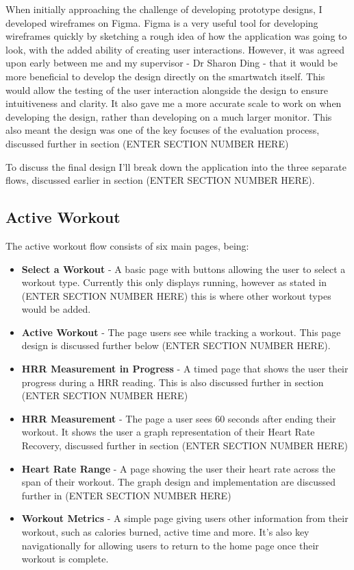 \documentclass{l4proj}
\begin{document}
When initially approaching the challenge of developing prototype designs, I developed wireframes on Figma. Figma is a very useful tool for developing wireframes quickly by sketching a rough idea of how the application was going to look, with the added ability of creating user interactions. However, it was agreed upon early between me and my supervisor - Dr Sharon Ding - that it would be more beneficial to develop the design directly on the smartwatch itself. This would allow the testing of the user interaction alongside the design to ensure intuitiveness and clarity. It also gave me a more accurate scale to work on when developing the design, rather than developing on a much larger monitor. This also meant the design was one of the key focuses of the evaluation process, discussed further in section (ENTER SECTION NUMBER HERE)

To discuss the final design I’ll break down the application into the three separate flows, discussed earlier in section (ENTER SECTION NUMBER HERE). 

\subsection{Active Workout}

The active workout flow consists of six main pages, being:

\begin{itemize}
    \item \textbf{Select a Workout} - A basic page with buttons allowing the user to select a workout type. Currently this only displays running, however as stated in (ENTER SECTION NUMBER HERE) this is where other workout types would be added.
    \item \textbf{Active Workout} - The page users see while tracking a workout. This page design is discussed further below (ENTER SECTION NUMBER HERE).
    \item \textbf{HRR Measurement in Progress} - A timed page that shows the user their progress during a HRR reading. This is also discussed further in section (ENTER SECTION NUMBER HERE)
    \item \textbf{HRR Measurement} - The page a user sees 60 seconds after ending their workout. It shows the user a graph representation of their Heart Rate Recovery, discussed further in section (ENTER SECTION NUMBER HERE)
    \item \textbf{Heart Rate Range} -  A page showing the user their heart rate across the span of their workout. The graph design and implementation are discussed further in (ENTER SECTION NUMBER HERE)
    \item \textbf{Workout Metrics} - A simple page giving users other information from their workout, such as calories burned, active time and more. It’s also key navigationally for allowing users to return to the home page once their workout is complete.
\end{itemize}
\end{document}
